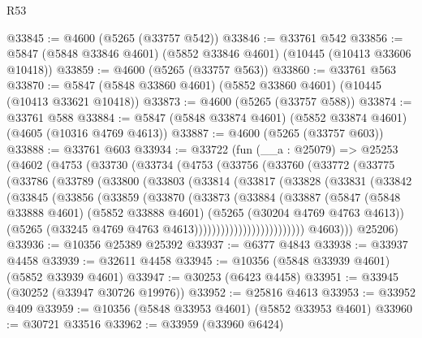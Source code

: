 \begin{lexlean}{R53}
\begin{coremodule}
@33845 := @4600 (@5265 (@33757 @542))
@33846 := @33761 @542
@33856 := @5847 (@5848 @33846 @4601) (@5852 @33846 @4601) (@10445 (@10413 @33606 @10418))
@33859 := @4600 (@5265 (@33757 @563))
@33860 := @33761 @563
@33870 := @5847 (@5848 @33860 @4601) (@5852 @33860 @4601) (@10445 (@10413 @33621 @10418))
@33873 := @4600 (@5265 (@33757 @588))
@33874 := @33761 @588
@33884 := @5847 (@5848 @33874 @4601) (@5852 @33874 @4601) (@4605 (@10316 @4769 @4613))
@33887 := @4600 (@5265 (@33757 @603))
@33888 := @33761 @603
@33934 := @33722
    (fun (__a : @25079) =>
    @25253
      (@4602
        (@4753
          (@33730
            (@33734
              (@4753
                (@33756
                  (@33760
                    (@33772
                      (@33775
                        (@33786
                          (@33789
                            (@33800
                              (@33803
                                (@33814
                                  (@33817
                                    (@33828
                                      (@33831
                                        (@33842
                                          (@33845
                                            (@33856
                                              (@33859
                                                (@33870
                                                  (@33873
                                                    (@33884
                                                      (@33887
                                                        (@5847
                                                          (@5848 @33888 @4601)
                                                          (@5852 @33888 @4601)
                                                          (@5265 (@30204 @4769 @4763 @4613))
                                                          (@5265
                                                            (@33245
                                                              @4769
                                                              @4763
                                                              @4613)))))))))))))))))))))))))
            @4603)))
      @25206)
@33936 := @10356 @25389 @25392
@33937 := @6377 @4843
@33938 := @33937 @4458
@33939 := @32611 @4458
@33945 := @10356 (@5848 @33939 @4601) (@5852 @33939 @4601)
@33947 := @30253 (@6423 @4458)
@33951 := @33945 (@30252 (@33947 @30726 @19976))
@33952 := @25816 @4613
@33953 := @33952 @409
@33959 := @10356 (@5848 @33953 @4601) (@5852 @33953 @4601)
@33960 := @30721 @33516
@33962 := @33959 (@33960 @6424)

\end{coremodule}
\end{lexlean}
